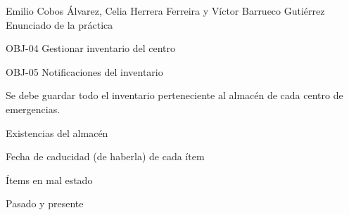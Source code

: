 {Emilio Cobos Álvarez, Celia Herrera Ferreira y Víctor Barrueco Gutiérrez}
{Enunciado de la práctica}
{OBJ-04 Gestionar inventario del centro \par
OBJ-05 Notificaciones del inventario}
{}
{Se debe guardar todo el inventario perteneciente al almacén de cada centro de emergencias.}
{
\item{Existencias del almacén}
\item{Fecha de caducidad (de haberla) de cada ítem}
\item{Ítems en mal estado}
}
{Pasado y presente}

